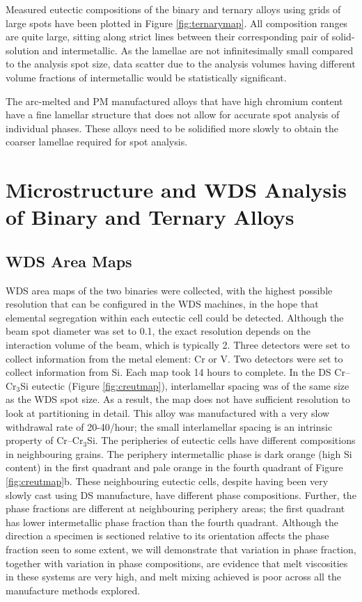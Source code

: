 Measured eutectic compositions of the binary and ternary alloys using grids of large spots have been plotted in Figure \ref{fig:ternarymap}.  All composition ranges are quite large, sitting along strict lines between their corresponding pair of solid-solution and intermetallic.  As the lamellae are not infinitesimally small compared to the analysis spot size, data scatter due to the analysis volumes having different volume fractions of intermetallic would be statistically significant.

The arc-melted and PM manufactured alloys that have high chromium content have a fine lamellar structure that does not allow for accurate spot analysis of individual phases.  These alloys need to be solidified more slowly to obtain the coarser lamellae required for spot analysis.
%

\section{Microstructure and WDS Analysis of Binary and Ternary Alloys}

\subsection{WDS Area Maps}

WDS area maps of the two binaries were collected, with the highest possible resolution that can be configured in the WDS machines, in the hope that elemental segregation within each eutectic cell could be detected.  Although the beam spot diameter was set to 0.1\micro\metre, the exact resolution depends on the interaction volume of the beam, which is typically 2\micro\metre.  Three detectors were set to collect information from the metal element: Cr or V.  Two detectors were set to collect information from Si.  Each map took 14 hours to complete.  In the DS Cr--Cr$_3$Si eutectic (Figure \ref{fig:creutmap}), interlamellar spacing was of the same size as the WDS spot size.  As a result, the map does not have sufficient resolution to look at partitioning in detail.  This alloy was manufactured with a very slow withdrawal rate of 20-40\milli\metre/hour; the small interlamellar spacing is an intrinsic property of Cr--Cr$_3$Si.  The peripheries of eutectic cells have different compositions in neighbouring grains.  The periphery intermetallic phase  is dark orange (high Si content) in the first quadrant and pale orange in the fourth quadrant of Figure \ref{fig:creutmap}b.  These neighbouring eutectic cells, despite having been very slowly cast using DS manufacture, have different phase compositions.  Further, the phase fractions are different at neighbouring periphery areas; the first quadrant has lower intermetallic phase fraction than the fourth quadrant.  Although the direction a specimen is sectioned relative to its orientation affects the phase fraction seen to some extent, we will demonstrate that variation in phase fraction, together with variation in phase compositions, are evidence that melt viscosities in these systems are very high, and melt mixing achieved is poor across all the manufacture methods explored.

